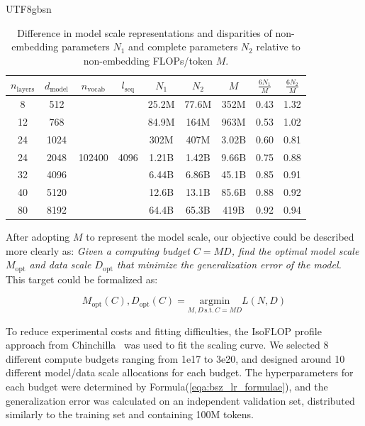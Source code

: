 \documentclass[11pt, a4paper, logo, copyright, nonumbering]{deepseek}
\begin{document}
\begin{CJK*}{UTF8}{gbsn}
\begin{table}[h]
    \centering
    \begin{tabular}{cccc|ccc|cc}
    \toprule
        $n_{\mathrm{layers}}$ & $d_{\mathrm{model}}$ & $n_{\mathrm{vocab}}$ & $l_{\mathrm{seq}}$ & $N_{1}$ & $N_{2}$ & $M$ & $\frac{6N_1}{M}$ & $\frac{6N_2}{M}$ \\
    \midrule
        8   & 512  & \multirow{7}{*}{102400} & \multirow{7}{*}{4096} & 25.2M & 77.6M & 352M  & 0.43 & 1.32 \\
        12  & 768  &  &  & 84.9M & 164M  & 963M  & 0.53 & 1.02 \\
        24  & 1024 &  &  & 302M  & 407M  & 3.02B & 0.60 & 0.81 \\
        24  & 2048 &  &  & 1.21B & 1.42B & 9.66B & 0.75 & 0.88 \\
        32  & 4096 &  &  & 6.44B & 6.86B & 45.1B & 0.85 & 0.91 \\
        40  & 5120 &  &  & 12.6B & 13.1B & 85.6B & 0.88 & 0.92 \\
        80  & 8192 &  &  & 64.4B & 65.3B & 419B  & 0.92 & 0.94 \\
    \bottomrule
    \end{tabular}
    \caption{Difference in model scale representations and disparities of non-embedding parameters $N_1$ and complete parameters $N_2$ relative to non-embedding FLOPs/token $M$.}
    \label{tab:6nd_approximation_error}
\end{table}

After adopting $M$ to represent the model scale, our objective could be described more clearly as: \emph{Given a computing budget $C=MD$, find the optimal model scale $M_{\mathrm{opt}}$ and data scale $D_{\mathrm{opt}}$ that minimize the generalization error of the model.} This target could be formalized as:

\begin{equation}
    M_{\mathrm{opt}}(C), D_{\mathrm{opt}}(C) = \underset{M, D\,\mathrm{s.t.}\,C=MD}{\mathrm{argmin}} L(N, D)
\end{equation}

To reduce experimental costs and fitting difficulties, the IsoFLOP profile approach from Chinchilla~\citep{chinchilla} was used to fit the scaling curve. We selected 8 different compute budgets ranging from 1e17 to 3e20, and designed around 10 different model/data scale allocations for each budget. The hyperparameters for each budget were determined by Formula(\ref{eqa:bsz_lr_formulae}), and the generalization error was calculated on an independent validation set, distributed similarly to the training set and containing 100M tokens.


\end{CJK*}
\end{document}
